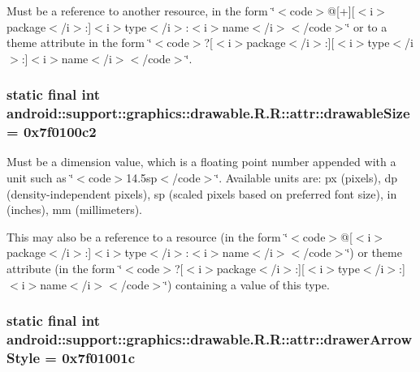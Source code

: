 Must be a reference to another resource, in the form \char`\"{}$<$code$>$@\mbox{[}+\mbox{]}\mbox{[}$<$i$>$package$<$/i$>$:\mbox{]}$<$i$>$type$<$/i$>$:$<$i$>$name$<$/i$>$$<$/code$>$\char`\"{} or to a theme attribute in the form \char`\"{}$<$code$>$?\mbox{[}$<$i$>$package$<$/i$>$:\mbox{]}\mbox{[}$<$i$>$type$<$/i$>$:\mbox{]}$<$i$>$name$<$/i$>$$<$/code$>$\char`\"{}. \hypertarget{classandroid_1_1support_1_1graphics_1_1drawable_1_1_r_1_1attr_7559edb353305fa15a0e5389bf82f7bb}{
\subsubsection[{drawableSize}]{\setlength{\rightskip}{0pt plus 5cm}static final int android::support::graphics::drawable.R.R::attr::drawableSize = 0x7f0100c2}}
\label{classandroid_1_1support_1_1graphics_1_1drawable_1_1_r_1_1attr_7559edb353305fa15a0e5389bf82f7bb}


Must be a dimension value, which is a floating point number appended with a unit such as \char`\"{}$<$code$>$14.5sp$<$/code$>$\char`\"{}. Available units are: px (pixels), dp (density-independent pixels), sp (scaled pixels based on preferred font size), in (inches), mm (millimeters). 

This may also be a reference to a resource (in the form \char`\"{}$<$code$>$@\mbox{[}$<$i$>$package$<$/i$>$:\mbox{]}$<$i$>$type$<$/i$>$:$<$i$>$name$<$/i$>$$<$/code$>$\char`\"{}) or theme attribute (in the form \char`\"{}$<$code$>$?\mbox{[}$<$i$>$package$<$/i$>$:\mbox{]}\mbox{[}$<$i$>$type$<$/i$>$:\mbox{]}$<$i$>$name$<$/i$>$$<$/code$>$\char`\"{}) containing a value of this type. \hypertarget{classandroid_1_1support_1_1graphics_1_1drawable_1_1_r_1_1attr_6f610594eba910b07a9eb35d0f4ced72}{
\subsubsection[{drawerArrowStyle}]{\setlength{\rightskip}{0pt plus 5cm}static final int android::support::graphics::drawable.R.R::attr::drawerArrowStyle = 0x7f01001c}}
\label{classandroid_1_1support_1_1graphics_1_1drawable_1_1_r_1_1attr_6f610594eba910b07a9eb35d0f4ced72}


